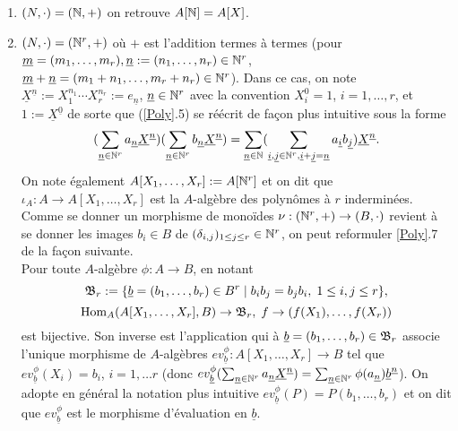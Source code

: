   \begin{enumerate}[leftmargin=* ,parsep=0cm,itemsep=0cm,topsep=0cm]
 \item  $(N,\cdot)=(\mathbb{N},+)$ on retrouve $A[\mathbb{N}]=A[X]$.\\
 \item $(N,\cdot)=(\mathbb{N}^r,+)$ où $+$ est l'addition termes à termes (pour $\underline{m}=(m_1,\dots,m_r), \underline{n}:=(n_1,\dots, n_r)\in \mathbb{N}^r$,   $\underline{m}+\underline{n}=(m_1+n_1,\dots,m_r+n_r)\in \mathbb{N}^r$). Dans ce cas, on note $\underline{X}^{\underline{n}}:=X_1^{n_1}\cdots X_r^{n_r}:=e_{\underline{n}}$, $\underline{n}\in \mathbb{N}^r$ avec la convention $X_i^0=1$, $i=1,\dots, r$,  et $1:=\underline{X}^{\underline{0}}$ de sorte que (\ref{Poly}.5) se réécrit de fa\c{c}on plus intuitive sous la forme
 $$ (\sum_{\underline{n}\in\mathbb{N}^r}a_{\underline{n}}\underline{X}^{\underline{n}}) (\sum_{\underline{n}\in \mathbb{N}^r}b_{\underline{n}}\underline{X}^{\underline{n}})=\sum_{\underline{n}\in \mathbb{N}}(\sum_{\underline{i},\underline{j}\in \mathbb{N}^r, \underline{i}+\underline{j}=\underline{n}}a_{\underline{i}}b_{\underline{j}})\underline{X}^{\underline{n}}.$$
On note également $A[X_1,\dots, X_r]:=A[\mathbb{N}^r]$ et on dit que $\iota_A:A\rightarrow A[X_1,\dots, X_r]$ est la $A$-algèbre des polynômes à $r$ inderminées. Comme se donner un morphisme de monoïdes $\nu:(\mathbb{N}^r,+)\rightarrow (B ,\cdot)$ revient à se donner les images $b_i\in B $ de $(\delta_{i,j})_{1\leq j\leq r}\in \mathbb{N}^r$, on peut reformuler \ref{Poly}.7 de la fa\c{c}on suivante.\\

   Pour toute $A$-algèbre $\phi:A\rightarrow B$, en notant  
 $$\frak{B}_r:= \lbrace \underline{b}=(b_1,\dots, b_r)\in B^r\;|\; b_ib_j=b_jb_i,\; 1\leq i,j\leq r\rbrace,$$
$$\hbox{\rm Hom}_A(A[X_1,\dots,X_r],B)\rightarrow \frak{B}_r,\; f\rightarrow (f(X_1),\dots, f(X_r))$$
 est bijective. Son inverse est l'application qui à $\underline{b}=(b_1,\dots, b_r)\in \frak{B}_r$ associe l'unique morphisme de $A$-algèbres $ev_{\underline{b}}^\phi:A[X_1,\dots, X_r]\rightarrow B$ tel que $ev_{\underline{b}}^\phi(X_i)=b_i$, $i=1,\dots r$ (donc $ev_{\underline{b}}^\phi(\sum_{\underline{n}\in \mathbb{N}^r}a_{\underline{n}}\underline{X}^{\underline{n}})=\sum_{\underline{n}\in \mathbb{N}^r}\phi(a_{\underline{n}})\underline{b}^{\underline{n}}$). On adopte  en général la notation plus intuitive $ev_{\underline{b}}^\phi(P)=P(b_1,\dots, b_r)$ et on dit que $ev_{\underline{b}}^\phi$ est le morphisme d'évaluation en $\underline{b}$.\\
 

\end{enumerate}
